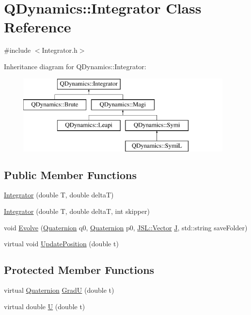 \hypertarget{classQDynamics_1_1Integrator}{}\section{Q\+Dynamics\+:\+:Integrator Class Reference}
\label{classQDynamics_1_1Integrator}


{\ttfamily \#include $<$Integrator.\+h$>$}

Inheritance diagram for Q\+Dynamics\+:\+:Integrator\+:\begin{figure}[H]
\begin{center}
\leavevmode
\includegraphics[height=4.000000cm]{classQDynamics_1_1Integrator}
\end{center}
\end{figure}
\subsection*{Public Member Functions}
\begin{DoxyCompactItemize}
\item 
\hyperlink{classQDynamics_1_1Integrator_a677dd555cee316d6d456b7da258c4385}{Integrator} (double T, double deltaT)
\item 
\hyperlink{classQDynamics_1_1Integrator_aa469124cb408fadbaa540555dfabee33}{Integrator} (double T, double deltaT, int skipper)
\item 
void \hyperlink{classQDynamics_1_1Integrator_a4b921b312775194b77c2c85f93add84e}{Evolve} (\hyperlink{classQDynamics_1_1Quaternion}{Quaternion} q0, \hyperlink{classQDynamics_1_1Quaternion}{Quaternion} p0, \hyperlink{classJSL_1_1Vector}{J\+S\+L\+::\+Vector} \hyperlink{classQDynamics_1_1Integrator_a7b99b22475321b34c1624bded3489954}{J}, std\+::string save\+Folder)
\item 
virtual void \hyperlink{classQDynamics_1_1Integrator_a4effa27d56f3205e53653b1fdc5cd08e}{Update\+Position} (double t)
\end{DoxyCompactItemize}
\subsection*{Protected Member Functions}
\begin{DoxyCompactItemize}
\item 
virtual \hyperlink{classQDynamics_1_1Quaternion}{Quaternion} \hyperlink{classQDynamics_1_1Integrator_a4688fbccd8b0dc5c9a73dddac66b486f}{GradU} (double t)
\item 
virtual double \hyperlink{classQDynamics_1_1Integrator_afa838ba8dfb0fbde1f77c6d2a45a9dd0}{U} (double t)
\end{DoxyCompactItemize}
